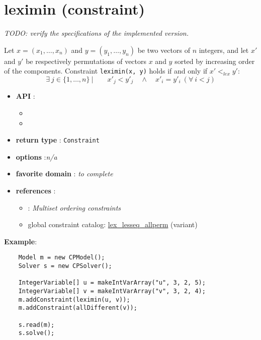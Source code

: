\label{leximin}
\hypertarget{leximin}{}

\section{leximin (constraint)}\label{leximin:leximinconstraint}\hypertarget{leximin:leximinconstraint}{}

\emph{TODO: verify the specifications of the implemented version.}

\begin{notedef}
Let $x = (x_1,\ldots, x_n)$ and $y = (y_1,\ldots, y_n)$ be two vectors of $n$ integers, and let $x'$ and $y'$ be respectively permutations of vectors $x$ and $y$ sorted by increasing order of the components.
Constraint \texttt{leximin(x, y)} holds if and only if $x'<_{lex} y'$:
$$\exists\ j\in\{1,\ldots,n\}\ |\qquad x'_j<y'_j\quad \land\quad x'_i=y'_i\ (\forall\  i<j)$$
  \end{notedef}

\begin{itemize}
	\item \textbf{API} :
	\begin{itemize}
		\item {}
		\item {}
	\end{itemize}
	\item \textbf{return type} : \texttt{Constraint}
	\item \textbf{options} :\emph{n/a}
	\item \textbf{favorite domain} : \emph{to complete}
	\item \textbf{references} :
      \begin{itemize}
      \item \cite{FrischIJCAI03}: \emph{Multiset ordering constraints} 
      \item global constraint catalog: \href{http://www.emn.fr/x-info/sdemasse/gccat/Clex_lesseq_allperm.html}{lex\_lesseq\_allperm} (variant)
      \end{itemize}
\end{itemize}

\textbf{Example}:
\begin{lstlisting}
	Model m = new CPModel();
	Solver s = new CPSolver();
	
	IntegerVariable[] u = makeIntVarArray("u", 3, 2, 5);
	IntegerVariable[] v = makeIntVarArray("v", 3, 2, 4);
	m.addConstraint(leximin(u, v));
	m.addConstraint(allDifferent(v));
	
	s.read(m);
	s.solve();
\end{lstlisting} 
